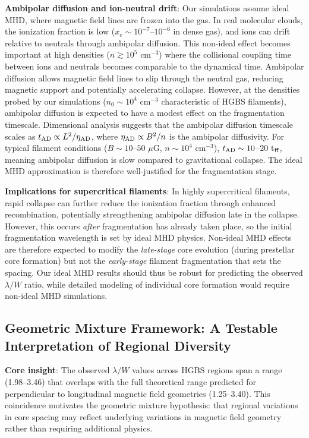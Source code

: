 \documentclass[twoside,twocolumn]{mnras}
\begin{document}
\textbf{Ambipolar diffusion and ion-neutral drift}: Our simulations assume ideal MHD, where magnetic field lines are frozen into the gas. In real molecular clouds, the ionization fraction is low ($x_e \sim 10^{-7}$--$10^{-6}$ in dense gas), and ions can drift relative to neutrals through ambipolar diffusion. This non-ideal effect becomes important at high densities ($n \gtrsim 10^5$ cm$^{-3}$) where the collisional coupling time between ions and neutrals becomes comparable to the dynamical time. Ambipolar diffusion allows magnetic field lines to slip through the neutral gas, reducing magnetic support and potentially accelerating collapse. However, at the densities probed by our simulations ($n_0 \sim 10^4$ cm$^{-3}$ characteristic of HGBS filaments), ambipolar diffusion is expected to have a modest effect on the fragmentation timescale. Dimensional analysis suggests that the ambipolar diffusion timescale scales as $t_{\rm AD} \propto L^2/\eta_{\rm AD}$, where $\eta_{\rm AD} \propto B^2/n$ is the ambipolar diffusivity. For typical filament conditions ($B \sim 10$--$50$ $\mu$G, $n \sim 10^4$ cm$^{-3}$), $t_{\rm AD} \sim 10$--$20$ t$_{\rm ff}$, meaning ambipolar diffusion is slow compared to gravitational collapse. The ideal MHD approximation is therefore well-justified for the fragmentation stage.

\textbf{Implications for supercritical filaments}: In highly supercritical filaments, rapid collapse can further reduce the ionization fraction through enhanced recombination, potentially strengthening ambipolar diffusion late in the collapse. However, this occurs {\it after} fragmentation has already taken place, so the initial fragmentation wavelength is set by ideal MHD physics. Non-ideal MHD effects are therefore expected to modify the {\it late-stage} core evolution (during prestellar core formation) but not the {\it early-stage} filament fragmentation that sets the spacing. Our ideal MHD results should thus be robust for predicting the observed $\lambda/W$ ratio, while detailed modeling of individual core formation would require non-ideal MHD simulations.

\subsection{Geometric Mixture Framework: A Testable Interpretation of Regional Diversity}

\textbf{Core insight}: The observed $\lambda/W$ values across HGBS regions span a range (1.98--3.46) that overlaps with the full theoretical range predicted for perpendicular to longitudinal magnetic field geometries (1.25--3.40). This coincidence motivates the geometric mixture hypothesis: that regional variations in core spacing may reflect underlying variations in magnetic field geometry rather than requiring additional physics.
\end{document}
